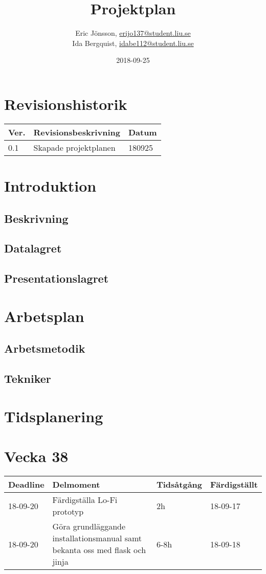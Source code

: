 \documentclass{TDP003mall}
\author{Eric Jönsson, \url{erijo137@student.liu.se}\\
  Ida Bergquist, \url{idabe112@student.liu.se}}
\title{Projektplan}
\date{2018-09-25}
\begin{document}
\projectpage
\tableofcontents
\newpage
\section{Revisionshistorik}
\begin{table}[!h]
\begin{tabularx}{\linewidth}{|l|X|l|}
\hline
\textbf{Ver.} & \textbf{Revisionsbeskrivning} & \textbf{Datum} \\\hline
0.1 & Skapade projektplanen & 180925 \\\hline
\end{tabularx}
\end{table}

\section{Introduktion}
\subsection{Beskrivning}
\subsection{Datalagret}
\subsection{Presentationslagret}

\section{Arbetsplan}
\subsection{Arbetsmetodik}
\subsection{Tekniker}

\section{Tidsplanering}

\section{Vecka 38}
\begin{table}[!h]
\begin{tabularx}{\linewidth}{|l|X|l|l|}
\hline
\textbf{Deadline} & \textbf{Delmoment} & \textbf{Tidsåtgång} & \textbf{Färdigställt}\\\hline
18-09-20 & Färdigställa Lo-Fi prototyp & 2h & 18-09-17  \\\hline
18-09-20 & Göra grundläggande installationsmanual samt bekanta
oss med flask och jinja & 6-8h & 18-09-18 \\\hline
\end{tabularx}
\end{table}
\end{document}
